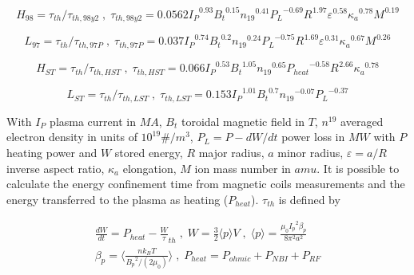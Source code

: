 \begin{equation}
{ H }_{ 98 }={\tau }_{ th }/{\tau }_{ th,98y2 } \; , \; {\tau }_{ th,98y2 }=0.0562 {{ I }_{ P }}^{ 0.93} {{ B }_{ t }}^{ 0.15} {{ n }_{ 19 }}^{ 0.41} {{ P }_{ L }}^{ -0.69} {{ R }_{  }}^{ 1.97} {{ \varepsilon  }_{  }}^{ 0.58} {{ \kappa  }_{ a }}^{ 0.78} {{ M }_{  }}^{ 0.19}
\label{eq:h98y2}
\end{equation}

\begin{equation}
{ L }_{ 97 }={\tau }_{ th }/{\tau }_{ th,97P } \; , \; {\tau }_{ th,97P }=0.037 {{ I }_{ P }}^{ 0.74} {{ B }_{ t }}^{ 0.2} {{ n }_{ 19 }}^{ 0.24} {{ P }_{ L }}^{ -0.75} {{ R }_{  }}^{ 1.69} {{ \varepsilon  }_{  }}^{ 0.31} {{ \kappa  }_{ a }}^{ 0.67} {{ M }_{  }}^{ 0.26}
\label{eq:l97}
\end{equation}


\begin{equation}
{ H }_{ ST }={\tau }_{ th }/{\tau }_{ th,HST } \; , \; {\tau }_{ th,HST }=0.066 {{ I }_{ P }}^{ 0.53} {{ B }_{ t }}^{ 1.05} {{ n }_{ 19 }}^{ 0.65} {{ P }_{ heat }}^{ -0.58} {{ R }_{  }}^{ 2.66} {{ \kappa  }_{ a }}^{ 0.78}
\label{eq:HST}
\end{equation}

\begin{equation}
{ L }_{ ST }={\tau }_{ th }/{\tau }_{ th,LST } \; , \; {\tau }_{ th,LST }=0.153 {{ I }_{ P }}^{ 1.01} {{ B }_{ t }}^{ 0.7} {{ n }_{ 19 }}^{ -0.07} {{ P }_{ L }}^{ -0.37}
\label{eq:LST}
\end{equation}

With $I_P$ plasma current in $MA$, $B_t$ toroidal magnetic field in $T$, $n^{19}$ averaged electron density in units of $10^{19} \#/m^3$, $P_L=P-dW/dt$ power loss in $MW$ with $P$ heating power and $W$ stored energy, $R$ major radius, $a$ minor radius, $\varepsilon=a/R$ inverse aspect ratio, $\kappa _a$ elongation, $M$ ion mass number in $amu$.
It is possible to calculate the energy confinement time from magnetic coils measurements and the energy transferred to the plasma as heating ($P_{heat}$). $\tau_{th}$ is defined by 

\begin{equation}
\begin{split}
\frac {dW} {dt}={P}_{heat} - \frac {W} {\tau }_{ th } \; , \; W=\frac { 3} {2} \langle p \rangle V \; , \; \langle p \rangle = \frac {{ \mu }_{ 0 } {{ I }_{ p }}^{ 2 } { \beta }_{ p }} { 8 {\pi}^{2} {a}^{2}  } \\ {\beta }_{ p } = \langle \frac { n {k}_{B} T} { {{B}_{p}}^{2} /(2 {\mu}_{0}) } \rangle \; , \; {P }_{ heat }={ P }_{ ohmic }+{ P }_{ NBI }+{ P }_{ RF }
\label{eq:tau}
\end{split}
\end{equation}


